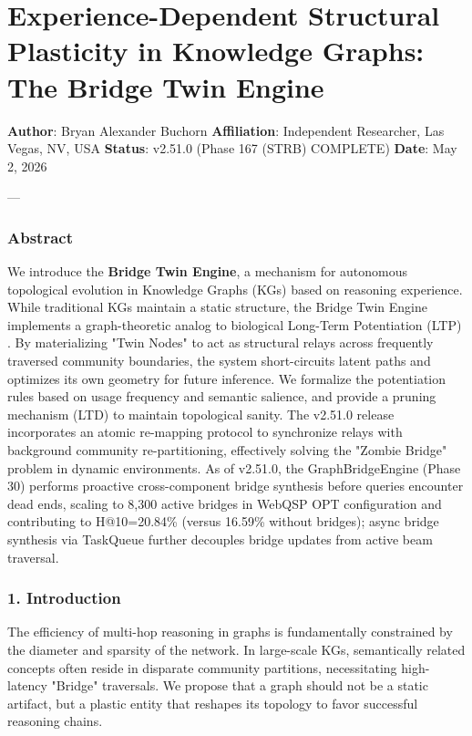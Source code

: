 \section{Experience-Dependent Structural Plasticity in Knowledge Graphs: The Bridge Twin Engine}

\textbf{Author}: Bryan Alexander Buchorn  
\textbf{Affiliation}: Independent Researcher, Las Vegas, NV, USA  
\textbf{Status}: v2.51.0 (Phase 167 (STRB) COMPLETE)
\textbf{Date}: May 2, 2026

---

\subsubsection{Abstract}
We introduce the \textbf{Bridge Twin Engine}, a mechanism for autonomous topological evolution in Knowledge Graphs (KGs) based on reasoning experience. While traditional KGs maintain a static structure, the Bridge Twin Engine implements a graph-theoretic analog to biological Long-Term Potent\-iation (LTP) \cite{hebb1949, bipoo1998}. By mater\-ializing "Twin Nodes" to act as structural relays across frequently traversed community boundaries, the system short-circuits latent paths and optimizes its own geometry for future inference. We formalize the poten\-tiation rules based on usage frequency and semantic salience, and provide a pruning mechanism (LTD) to maintain topological sanity. The v2.51.0 release incor\-porates an atomic re-mapping protocol to synchronize relays with background community re-parti\-tioning, effectively solving the "Zombie Bridge" problem in dynamic envir\-onments. As of v2.51.0, the GraphBridgeEngine (Phase 30) performs proactive cross-component bridge synthesis before queries encounter dead ends, scaling to 8,300 active bridges in WebQSP OPT confi\-guration and contr\-ibuting to H@10=20.84\% (versus 16.59\% without bridges); async bridge synthesis via TaskQueue further decouples bridge updates from active beam traversal.

\subsubsection{1. Introd\-uction}
The efficiency of multi-hop reasoning in graphs is funda\-mentally constrained by the diameter and sparsity of the network. In large-scale KGs, seman\-tically related concepts often reside in disparate community partitions, neces\-sitating high-latency "Bridge" traversals. We propose that a graph should not be a static artifact, but a plastic entity that reshapes its topology to favor successful reasoning chains.

